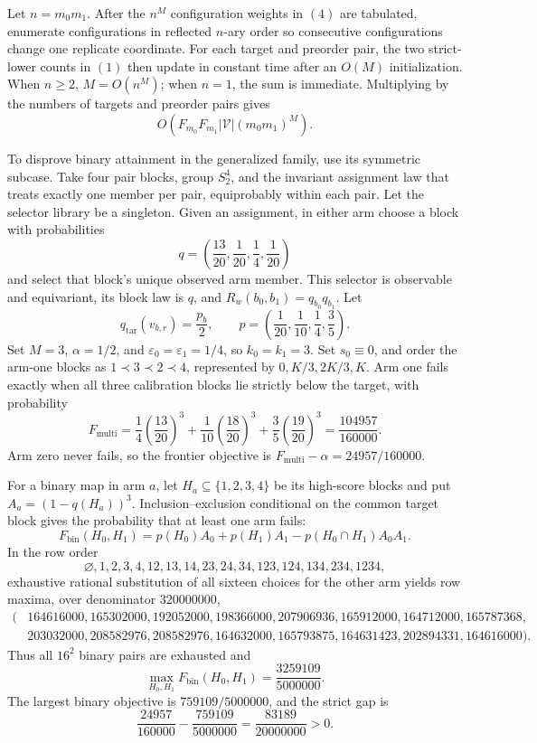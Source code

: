 Let \(n=m_0m_1\). After the \(n^M\) configuration weights in \((4)\) are tabulated, enumerate configurations in reflected \(n\)-ary order so consecutive configurations change one replicate coordinate. For each target and preorder pair, the two strict-lower counts in \((1)\) then update in constant time after an \(O(M)\) initialization. When \(n\ge2\), \(M=O(n^M)\); when \(n=1\), the sum is immediate. Multiplying by the numbers of targets and preorder pairs gives
\[
O\!\left(F_{m_0}F_{m_1}|\mathcal V|(m_0m_1)^M\right).
\tag{5}
\]

To disprove binary attainment in the generalized family, use its symmetric subcase. Take four pair blocks, group \(S_2^4\), and the invariant assignment law that treats exactly one member per pair, equiprobably within each pair. Let the selector library be a singleton. Given an assignment, in either arm choose a block with probabilities
\[
q=\left(\frac{13}{20},\frac1{20},\frac14,\frac1{20}\right)
\]
and select that block's unique observed arm member. This selector is observable and equivariant, its block law is \(q\), and \(R_w(b_0,b_1)=q_{b_0}q_{b_1}\). Let
\[
q_{\mathrm{tar}}(v_{b,r})=\frac{p_b}{2},
\qquad
p=\left(\frac1{20},\frac1{10},\frac14,\frac35\right).
\]
Set \(M=3\), \(\alpha=1/2\), and \(\varepsilon_0=\varepsilon_1=1/4\), so \(k_0=k_1=3\). Set \(s_0\equiv0\), and order the arm-one blocks as \(1\prec 3\prec 2\prec 4\), represented by \(0,K/3,2K/3,K\). Arm one fails exactly when all three calibration blocks lie strictly below the target, with probability
\[
F_{\mathrm{multi}}
=\frac14\left(\frac{13}{20}\right)^3
+\frac1{10}\left(\frac{18}{20}\right)^3
+\frac35\left(\frac{19}{20}\right)^3
=\frac{104957}{160000}.
\tag{6}
\]
Arm zero never fails, so the frontier objective is \(F_{\mathrm{multi}}-\alpha=24957/160000\).

For a binary map in arm \(a\), let \(H_a\subseteq\{1,2,3,4\}\) be its high-score blocks and put \(A_a=(1-q(H_a))^3\). Inclusion--exclusion conditional on the common target block gives the probability that at least one arm fails:
\[
F_{\mathrm{bin}}(H_0,H_1)
=p(H_0)A_0+p(H_1)A_1-p(H_0\cap H_1)A_0A_1.
\tag{7}
\]
In the row order
\[
\varnothing,1,2,3,4,12,13,14,23,24,34,123,124,134,234,1234,
\]
exhaustive rational substitution of all sixteen choices for the other arm yields row maxima, over denominator \(320000000\),
\[
\begin{split}
(&164616000,165302000,192052000,198366000,207906936,165912000,164712000,165787368,\\
&203032000,208582976,208582976,164632000,165793875,164631423,202894331,164616000).
\end{split}
\tag{8}
\]
Thus all \(16^2\) binary pairs are exhausted and
\[
\max_{H_0,H_1}F_{\mathrm{bin}}(H_0,H_1)=\frac{3259109}{5000000}.
\]
The largest binary objective is \(759109/5000000\), and the strict gap is
\[
\frac{24957}{160000}-\frac{759109}{5000000}
=\frac{83189}{20000000}>0.
\tag{9}
\]

